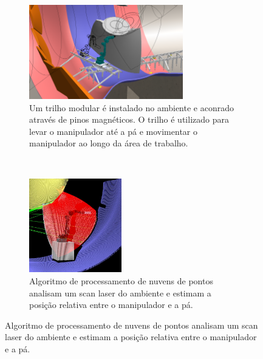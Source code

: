 \begin{figure}[htbp]
\centering
\begin{subfigure}[t]{0.45\textwidth}
\includegraphics[width=\textwidth,
height=4.1cm]{figs/EMMA_Base_Secundaria_01}
\caption{Um trilho modular é instalado no ambiente e aconrado através de pinos
magnéticos. O trilho é utilizado para levar o manipulador até a pá e movimentar
o manipulador ao longo da área de trabalho.}
\label{fig:subim3}
\end{subfigure}
~
\begin{subfigure}[t]{0.45\textwidth}
\includegraphics[width=\textwidth, height=4.1cm]{figs/localizacao}
\caption{Algoritmo de processamento de nuvens de pontos analisam um scan laser
do ambiente e estimam a posição relativa entre o manipulador e a pá.}
\label{fig:subim4}
\end{subfigure}
\label{fig:image2}
\end{figure}


